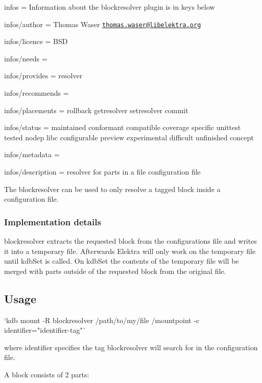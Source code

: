 
\begin{DoxyItemize}
\item infos = Information about the blockresolver plugin is in keys below
\item infos/author = Thomas Waser \href{mailto:thomas.waser@libelektra.org}{\tt thomas.\+waser@libelektra.\+org}
\item infos/licence = B\+SD
\item infos/needs =
\item infos/provides = resolver
\item infos/recommends =
\item infos/placements = rollback getresolver setresolver commit
\item infos/status = maintained conformant compatible coverage specific unittest tested nodep libc configurable preview experimental difficult unfinished concept
\item infos/metadata =
\item infos/description = resolver for parts in a file configuration file
\end{DoxyItemize}

The {\ttfamily blockresolver} can be used to only resolve a tagged block inside a configuration file.

\subsubsection*{Implementation details}

{\ttfamily blockresolver} extracts the requested block from the configurations file and writes it into a temporary file. Afterwards Elektra will only work on the temporary file until kdb\+Set is called. On kdb\+Set the contents of the temporary file will be merged with parts outside of the requested block from the original file.

\subsection*{Usage}

\begin{DoxyVerb}`kdb mount -R blockresolver /path/to/my/file /mountpoint -c identifier="identifier-tag"`
\end{DoxyVerb}


where {\ttfamily identifier} specifies the tag {\ttfamily blockresolver} will search for in the configuration file.

A block consists of 2 parts\+:


